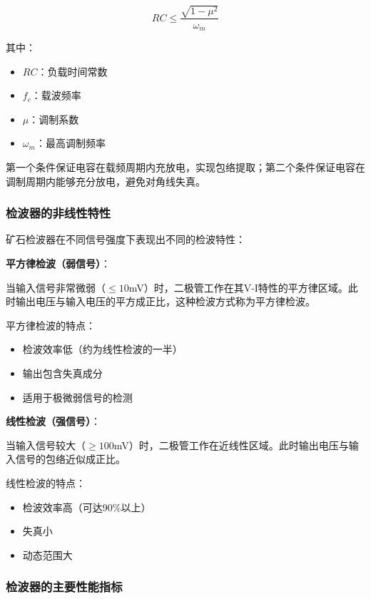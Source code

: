 \begin{equation}
RC \leq \frac{\sqrt{1-\mu^2}}{\omega_m}
\end{equation}

其中：
\begin{itemize}
    \item $RC$：负载时间常数
    \item $f_c$：载波频率
    \item $\mu$：调制系数
    \item $\omega_m$：最高调制频率
\end{itemize}

第一个条件保证电容在载频周期内充放电，实现包络提取；第二个条件保证电容在调制周期内能够充分放电，避免对角线失真。

\subsubsection{检波器的非线性特性}
\label{sec:detector_nonlinearity}

矿石检波器在不同信号强度下表现出不同的检波特性：

\textbf{平方律检波（弱信号）}：

当输入信号非常微弱（$\leq 10$mV）时，二极管工作在其V-I特性的平方律区域。此时输出电压与输入电压的平方成正比，这种检波方式称为平方律检波。

平方律检波的特点：
\begin{itemize}
    \item 检波效率低（约为线性检波的一半）
    \item 输出包含失真成分
    \item 适用于极微弱信号的检测
\end{itemize}

\textbf{线性检波（强信号）}：

当输入信号较大（$\geq 100$mV）时，二极管工作在近线性区域。此时输出电压与输入信号的包络近似成正比。

线性检波的特点：
\begin{itemize}
    \item 检波效率高（可达90\%以上）
    \item 失真小
    \item 动态范围大
\end{itemize}

\subsubsection{检波器的主要性能指标}
\label{sec:detector_performance}

